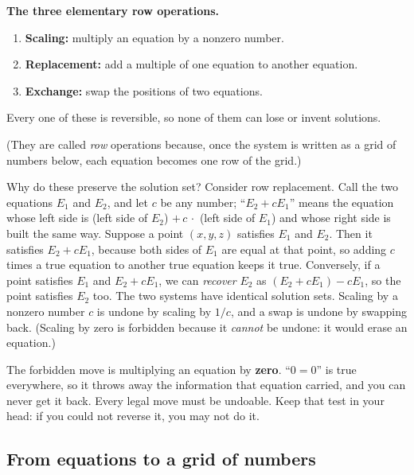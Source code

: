 \begin{focusbox}
\textbf{The three elementary row operations.}
\begin{enumerate}
  \item \textbf{Scaling:} multiply an equation by a nonzero number.
  \item \textbf{Replacement:} add a multiple of one equation to another equation.
  \item \textbf{Exchange:} swap the positions of two equations.
\end{enumerate}
Every one of these is reversible, so none of them can lose or invent solutions.
\end{focusbox}

(They are called \emph{row} operations because, once the system is written as a
grid of numbers below, each equation becomes one row of the grid.)

Why do these preserve the solution set? Consider row replacement. Call the two
equations $E_1$ and $E_2$, and let $c$ be any number; ``$E_2 + cE_1$'' means the
equation whose left side is (left side of $E_2$) $+\,c\,\cdot$ (left side of
$E_1$) and whose right side is built the same way. Suppose
a point $(x,y,z)$ satisfies $E_1$ and $E_2$. Then it
satisfies $E_2 + cE_1$, because both sides of $E_1$ are equal
at that point, so adding $c$ times a true equation to another true equation
keeps it true. Conversely, if a point satisfies $E_1$ and $E_2 + cE_1$, we can
\emph{recover} $E_2$ as $(E_2 + cE_1) - cE_1$, so the point satisfies $E_2$ too.
The two systems have identical solution sets. Scaling by a nonzero number $c$ is
undone by scaling by $1/c$, and a swap is undone by swapping back. (Scaling by
zero is forbidden because it \emph{cannot} be undone: it would erase an equation.)

\begin{trapbox}
The forbidden move is multiplying an equation by \textbf{zero}. ``$0 = 0$'' is
true everywhere, so it throws away the information that equation carried, and you
can never get it back. Every legal move must be undoable. Keep that test in your
head: if you could not reverse it, you may not do it.
\end{trapbox}

\subsection{From equations to a grid of numbers}

